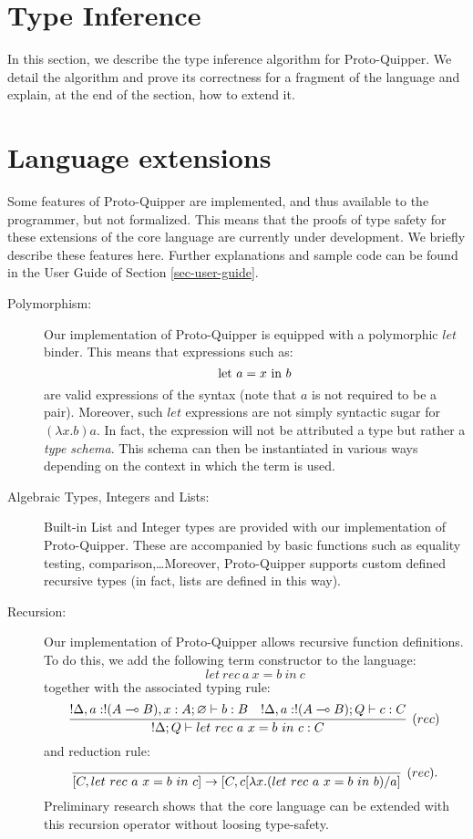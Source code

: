 \documentclass{article}
\begin{document}
\section{Type Inference}

In this section, we describe the type inference algorithm 
for Proto-Quipper. We detail the algorithm and prove its 
correctness for a fragment of the language and explain, 
at the end of the section, how to extend it.




\section{Language extensions}
\label{sec-extensions}

Some features of Proto-Quipper are implemented, and thus available 
to the programmer, but not formalized. This means that the proofs 
of type safety for these extensions of the core language are 
currently under development. We briefly describe these features 
here. Further explanations and sample code can be found in the 
User Guide of Section \ref{sec-user-guide}.
\begin{description}
  \item[Polymorphism:] Our implementation of Proto-Quipper is 
    equipped with a polymorphic $let$ binder. This means that 
    expressions such as:
    \[
    \text{let}~ a = x ~\text{in}~ b
    \]
    are valid expressions of the syntax (note that $a$ is not required 
    to be a pair). Moreover, such $let$ expressions are not simply 
    syntactic sugar for $(\lambda x.b)a$. In fact, the expression
    will not be attributed a type but rather a \emph{type schema}.
    This schema can then be instantiated in various ways depending 
    on the context in which the term is used. 
  \item[Algebraic Types, Integers and Lists:] Built-in List and 
    Integer types are provided with our implementation of Proto-Quipper.
    These are accompanied by basic functions such as equality testing, 
    comparison,\ldots Moreover, Proto-Quipper supports custom defined
    recursive types (in fact, lists are defined in this way).
  \item[Recursion:] Our implementation of Proto-Quipper allows 
    recursive function definitions. To do this, we add the following 
    term constructor to the language:
    \[
    let~rec~ a ~x = b~ in~ c
    \]    
    together with the associated typing rule:
    \[
    \infer[(rec)]{!\Delta;Q \entails let~rec~ a ~x = b~ in~ c:C}{
      !\Delta,a:!(A\loli B), x:A;\varnothing \entails b:B
      &
      !\Delta, a:!(A\loli B) ;Q \entails c:C      
    }
    \]
    and reduction rule:
    \[
    \infer[(rec).]{[C,let~rec~ a ~x = b~ in~ c]\to [C, c[\lambda x.(let~rec~ a ~x = b~ in~ b)/a]}{}
    \]
    Preliminary research shows that the core language can be extended 
    with this recursion operator without loosing type-safety. 
\end{description}
\end{document}

